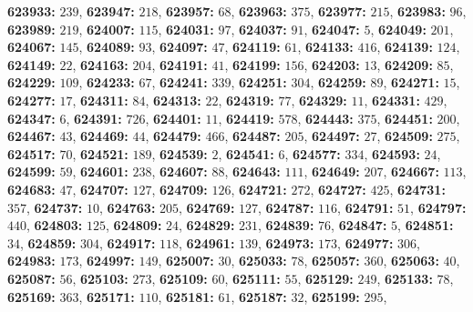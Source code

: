 \textsf{\bfseries 623933:} $239$, \textsf{\bfseries 623947:} $218$, \textsf{\bfseries 623957:} $68$, \textsf{\bfseries 623963:} $375$, \textsf{\bfseries 623977:} $215$, \textsf{\bfseries 623983:} $96$, \textsf{\bfseries 623989:} $219$, \textsf{\bfseries 624007:} $115$, \textsf{\bfseries 624031:} $97$, \textsf{\bfseries 624037:} $91$, \textsf{\bfseries 624047:} $5$, \textsf{\bfseries 624049:} $201$, \textsf{\bfseries 624067:} $145$, \textsf{\bfseries 624089:} $93$, \textsf{\bfseries 624097:} $47$, \textsf{\bfseries 624119:} $61$, \textsf{\bfseries 624133:} $416$, \textsf{\bfseries 624139:} $124$, \textsf{\bfseries 624149:} $22$, \textsf{\bfseries 624163:} $204$, \textsf{\bfseries 624191:} $41$, \textsf{\bfseries 624199:} $156$, \textsf{\bfseries 624203:} $13$, \textsf{\bfseries 624209:} $85$, \textsf{\bfseries 624229:} $109$, \textsf{\bfseries 624233:} $67$, \textsf{\bfseries 624241:} $339$, \textsf{\bfseries 624251:} $304$, \textsf{\bfseries 624259:} $89$, \textsf{\bfseries 624271:} $15$, \textsf{\bfseries 624277:} $17$, \textsf{\bfseries 624311:} $84$, \textsf{\bfseries 624313:} $22$, \textsf{\bfseries 624319:} $77$, \textsf{\bfseries 624329:} $11$, \textsf{\bfseries 624331:} $429$, \textsf{\bfseries 624347:} $6$, \textsf{\bfseries 624391:} $726$, \textsf{\bfseries 624401:} $11$, \textsf{\bfseries 624419:} $578$, \textsf{\bfseries 624443:} $375$, \textsf{\bfseries 624451:} $200$, \textsf{\bfseries 624467:} $43$, \textsf{\bfseries 624469:} $44$, \textsf{\bfseries 624479:} $466$, \textsf{\bfseries 624487:} $205$, \textsf{\bfseries 624497:} $27$, \textsf{\bfseries 624509:} $275$, \textsf{\bfseries 624517:} $70$, \textsf{\bfseries 624521:} $189$, \textsf{\bfseries 624539:} $2$, \textsf{\bfseries 624541:} $6$, \textsf{\bfseries 624577:} $334$, \textsf{\bfseries 624593:} $24$, \textsf{\bfseries 624599:} $59$, \textsf{\bfseries 624601:} $238$, \textsf{\bfseries 624607:} $88$, \textsf{\bfseries 624643:} $111$, \textsf{\bfseries 624649:} $207$, \textsf{\bfseries 624667:} $113$, \textsf{\bfseries 624683:} $47$, \textsf{\bfseries 624707:} $127$, \textsf{\bfseries 624709:} $126$, \textsf{\bfseries 624721:} $272$, \textsf{\bfseries 624727:} $425$, \textsf{\bfseries 624731:} $357$, \textsf{\bfseries 624737:} $10$, \textsf{\bfseries 624763:} $205$, \textsf{\bfseries 624769:} $127$, \textsf{\bfseries 624787:} $116$, \textsf{\bfseries 624791:} $51$, \textsf{\bfseries 624797:} $440$, \textsf{\bfseries 624803:} $125$, \textsf{\bfseries 624809:} $24$, \textsf{\bfseries 624829:} $231$, \textsf{\bfseries 624839:} $76$, \textsf{\bfseries 624847:} $5$, \textsf{\bfseries 624851:} $34$, \textsf{\bfseries 624859:} $304$, \textsf{\bfseries 624917:} $118$, \textsf{\bfseries 624961:} $139$, \textsf{\bfseries 624973:} $173$, \textsf{\bfseries 624977:} $306$, \textsf{\bfseries 624983:} $173$, \textsf{\bfseries 624997:} $149$, \textsf{\bfseries 625007:} $30$, \textsf{\bfseries 625033:} $78$, \textsf{\bfseries 625057:} $360$, \textsf{\bfseries 625063:} $40$, \textsf{\bfseries 625087:} $56$, \textsf{\bfseries 625103:} $273$, \textsf{\bfseries 625109:} $60$, \textsf{\bfseries 625111:} $55$, \textsf{\bfseries 625129:} $249$, \textsf{\bfseries 625133:} $78$, \textsf{\bfseries 625169:} $363$, \textsf{\bfseries 625171:} $110$, \textsf{\bfseries 625181:} $61$, \textsf{\bfseries 625187:} $32$, \textsf{\bfseries 625199:} $295$, 
